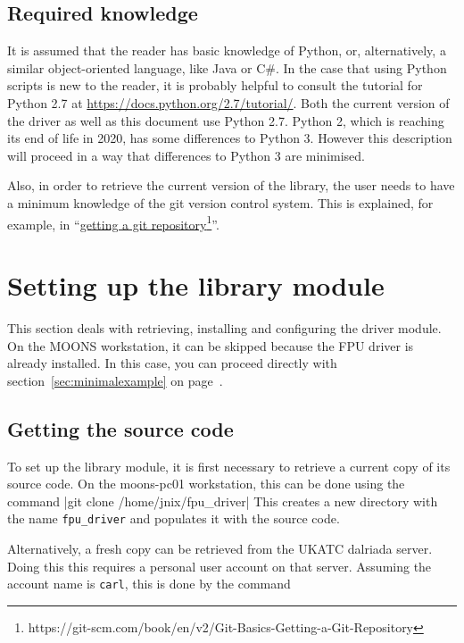 \documentclass[11pt,a4paper]{report}
\begin{document}
\subsection{Required knowledge}

It is assumed that the reader has basic knowledge of Python, or,
alternatively, a similar object-oriented language, like Java or C\#.
In the case that using Python scripts is new to the reader, it is
probably helpful to consult the tutorial for Python 2.7 at
\url{https://docs.python.org/2.7/tutorial/}.  Both the current version
of the driver as well as this document use Python 2.7. Python 2, which
is reaching its end of life in 2020, has some differences to Python
3. However this description will proceed in a way that differences to
Python 3 are minimised.

Also, in order to retrieve the current version of the library, the
user needs to have a minimum knowledge of the git version control
system. This is explained, for example, in
``\href{https://git-scm.com/book/en/v2/Git-Basics-Getting-a-Git-Repository}{getting
  a git repository}\footnote{https://git-scm.com/book/en/v2/Git-Basics-Getting-a-Git-Repository}''.

\section{Setting up the library module}

This section deals with retrieving, installing and configuring the
driver module. On the MOONS workstation, it can be skipped because the
FPU driver is already installed.  In this case, you can proceed
directly with section~\ref{sec:minimalexample} on
page~\pageref{sec:minimalexample}.

\subsection{Getting the source code}

To set up the library module, it is first
necessary to retrieve a current copy of its source code.
On the moons-pc01 workstation, this can be done using the
command |git clone /home/jnix/fpu_driver|
This creates a new directory with the name \texttt{fpu\_driver}
and populates it with the source code.

Alternatively, a fresh copy can be retrieved from the UKATC dalriada
server. Doing this this requires a personal user account on that
server. Assuming the account name is \texttt{carl}, this is done by
the command
\end{document}
